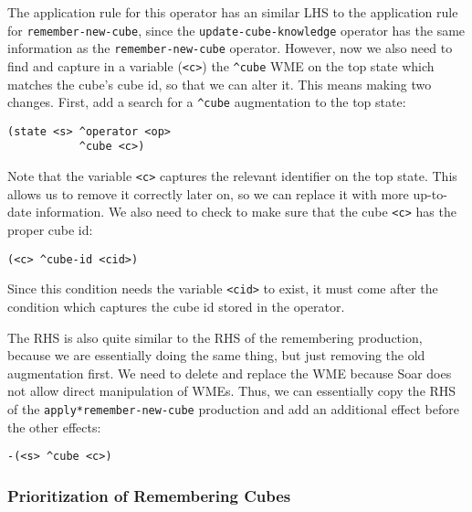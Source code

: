 The application rule for this operator has an similar LHS to the
application rule for \texttt{remember-new-cube}, since the
\texttt{update-cube-knowledge} operator has the same information as the
\texttt{remember-new-cube} operator. However, now we also need to find
and capture in a variable (\texttt{\textless{}c\textgreater{}}) the
\texttt{\^{}cube} WME on the top state which matches the cube's cube id,
so that we can alter it. This means making two changes. First, add a
search for a \texttt{\^{}cube} augmentation to the top state:

\begin{verbatim}
(state <s> ^operator <op>
           ^cube <c>)
\end{verbatim}

Note that the variable \texttt{\textless{}c\textgreater{}} captures the
relevant identifier on the top state. This allows us to remove it
correctly later on, so we can replace it with more up-to-date
information. We also need to check to make sure that the cube
\texttt{\textless{}c\textgreater{}} has the proper cube id:

\begin{verbatim}
(<c> ^cube-id <cid>)
\end{verbatim}

Since this condition needs the variable
\texttt{\textless{}cid\textgreater{}} to exist, it must come after the
condition which captures the cube id stored in the operator.

The RHS is also quite similar to the RHS of the remembering production,
because we are essentially doing the same thing, but just removing the
old augmentation first. We need to delete and replace the WME because
Soar does not allow direct manipulation of WMEs. Thus, we can
essentially copy the RHS of the \texttt{apply*remember-new-cube}
production and add an additional effect before the other effects:

\begin{verbatim}
-(<s> ^cube <c>)
\end{verbatim}

\hypertarget{prioritization-of-remembering-cubes}{%
\subsubsection{Prioritization of Remembering
Cubes}\label{prioritization-of-remembering-cubes}}

